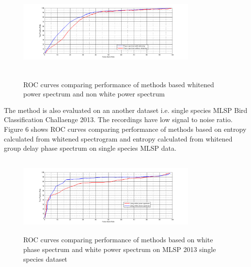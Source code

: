 \documentclass[a4paper]{article}
\begin{document}
 \begin{figure}[!ht]
 	\centering
 	\includegraphics[width=9cm, height=5cm]{phase_non_white_vs_phase_white}
 	\caption{ROC curves comparing performance of methods based whitened power spectrum and non white power spectrum}   
 \end{figure} 
 
 
 
 
The method is also evaluated on an another dataset i.e. single species MLSP Bird Classification Challaenge 2013. The recordings have low signal to noise ratio.  Figure 6 shows ROC curves comparing performance of methods based on entropy calculated from whitened spectrogram and entropy calculated from whitened group delay phase spectrum on single species MLSP data.

 
\begin{figure}[!ht]
	\centering
	\includegraphics[width=9cm, height=4cm]{ROC_data_2_gd_vs_spectogram_white}
	\caption{ROC curves comparing performance of methods based on white phase spectrum and white power spectrum on MLSP 2013 single species dataset }   
\end{figure} 

 
\end{document}
